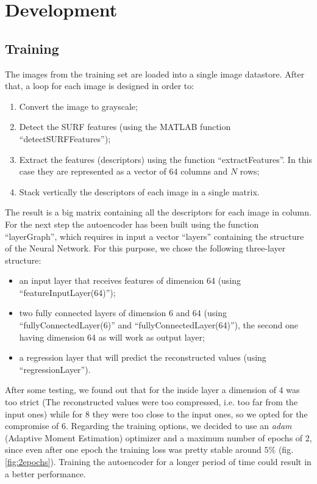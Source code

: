 
\section{Development}
\subsection{Training}
The images from the training set are loaded into a single image datastore. After that, a loop for each image is designed in order to:
\begin{enumerate}
\item Convert the image to grayscale;
\item Detect the SURF features (using the MATLAB function ``detectSURFFeatures'');
\item Extract the features (descriptors) using the function ``extractFeatures''. In this case they are represented as a vector of $64$ columns and $N$ rows;
\item Stack vertically the descriptors of each image in a single matrix.
\end{enumerate}
The result is a big matrix containing all the descriptors for each image in column. For the next step the autoencoder has been built using the function ``layerGraph'', which requires in input a vector ``layers'' containing the structure of the Neural Network. For this purpose, we chose the following three-layer structure:
\begin{itemize}
\item an input layer that receives features of dimension 64 (using \\ ``featureInputLayer(64)'');
\item two fully connected layers of dimension 6 and 64 (using ``fullyConnectedLayer(6)'' and ``fullyConnectedLayer(64)''), the second one having dimension 64 as will work as output layer;
\item a regression layer that will predict the reconstructed values (using \\ ``regressionLayer'').
\end{itemize}
After some testing, we found out that for the inside layer a dimension of $4$ was too strict (The reconstructed values were too compressed, i.e. too far from the input ones) while for $8$ they were too close to the input ones, so we opted for the compromise of $6$.
Regarding the training options, we decided to use an \emph{adam} (Adaptive Moment Estimation) optimizer and a maximum number of epochs of 2, since even after one epoch the training loss was pretty stable around $5\%$ (fig. \ref{fig:2epochs}). Training the autoencoder for a longer period of time could result in a better performance.

